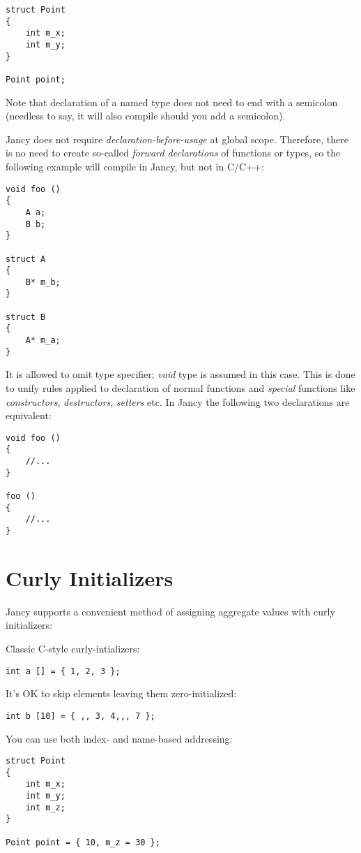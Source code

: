 \documentclass[oneside]{book}
\begin{document}
\begin{lstlisting}
struct Point
{
	int m_x;
	int m_y;
} 

Point point;
\end{lstlisting}

Note that declaration of a named type does not need to end with a semicolon (needless to say, it will also compile should you add a semicolon).

Jancy does not require \emph{declaration-before-usage} at global scope. Therefore, there is no need to create so-called \emph{forward declarations} of functions or types, so the following example will compile in Jancy, but not in C/C++:

\begin{lstlisting}
void foo ()
{
	A a;
	B b;
}

struct A
{
	B* m_b;
}

struct B
{
	A* m_a;
}
\end{lstlisting}

It is allowed to omit type specifier; \emph{void} type is assumed in this case. This is done to unify rules applied to declaration of normal functions and \emph{special} functions like \emph{constructors}, \emph{destructors}, \emph{setters} etc. In Jancy the following two declarations are equivalent:

\begin{lstlisting}
void foo ()
{
	//...
}

foo ()
{
	//...
}
\end{lstlisting}

\section{Curly Initializers}
Jancy supports a convenient method of assigning aggregate values with curly initializers:

Classic C-style curly-intializers:

\begin{lstlisting}
int a [] = { 1, 2, 3 };
\end{lstlisting}

It's OK to skip elements leaving them zero-initialized:

\begin{lstlisting}
int b [10] = { ,, 3, 4,,, 7 };
\end{lstlisting}

You can use both index- and name-based addressing:

\begin{lstlisting}
struct Point
{
    int m_x;
    int m_y;
    int m_z;
}
    
Point point = { 10, m_z = 30 };
\end{lstlisting}
\end{document}
